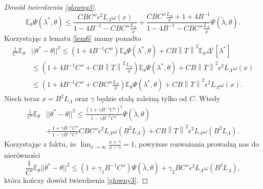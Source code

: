 \documentclass[man,mfiu]{mgrwms}
\newcommand{\norm}[1]{\left\lVert#1\right\rVert}
\begin{document}
\begin{proof}[Dowód twierdzenia \ref{glowny3}]
\begin{displaymath}
\mathbb{E}_{\theta}\Psi(\lambda^*,\theta)\leq \frac{CBC''\epsilon^2L_{\Lambda}\omega (x)}{1-4B^{-1}-CBC''\frac{L_{\Lambda}}{x}}+\frac{CBC''\frac{L_{\Lambda}}{x}+1+4B^{-1}}{1-4B^{-1}-CBC''\frac{L_{\Lambda}}{x}}\Psi(\tilde{\lambda},\theta).
\end{displaymath}
Korzystając z lematu \ref{lem6} mamy ponadto
\begin{displaymath}
\begin{split}
\frac{1}{C'}\mathbb{E}_{\theta}&||\theta^*-\theta||^2\leq (1+4B^{-1}C'')\mathbb{E}_{\theta}\Psi(\lambda^*,\theta)+CB\norm{T}^2\mathbb{E}_{\theta}\Delta^{\epsilon}[\lambda^*]\\
&\leq \left(1+4B^{-1}C''+CB\norm{T}^2\frac{L_{\Lambda}}{x}\right)\mathbb{E}_{\theta}\Psi(\lambda^*,\theta)+CB\norm{T}^2\epsilon^2L_{\Lambda}\omega (x)\\
&\leq \left(1+4B^{-1}C''+CBC''\frac{L_{\Lambda}}{x}\right)\mathbb{E}_{\theta}\Psi(\lambda^*,\theta)+CB\norm{T}^2\epsilon^2L_{\Lambda}\omega (x).
\end{split}
\end{displaymath}
Niech teraz $x=B^2L_{\Lambda}$ oraz $\gamma$ będzie stałą zależną tylko od $C$. Wtedy 
\begin{displaymath}
\begin{split}
\frac{1}{C'}\mathbb{E}_{\theta}&||\theta^*-\theta||^2\leq \frac{(1+\gamma B^{-1}C'')^2}{1-\gamma B^{-1}C''}\Psi(\tilde{\lambda},\theta)\\
&+ \frac{1+\gamma B^{-1}C''}{1-\gamma B^{-1}C''}CBC''\epsilon^2L_{\Lambda}\omega (B^2L_{\Lambda})+CB\norm{T}^2\epsilon^2L_{\Lambda}\omega (B^2L_{\Lambda}).
\end{split}
\end{displaymath}
Korzystając z faktu, że $\lim_{x\to \infty}\frac{x+\gamma}{x-\gamma}=1$, powyższe rozważania prowadzą nas do nierówności  
\begin{displaymath}
\frac{1}{C'}\mathbb{E}_{\theta}||\theta^*-\theta||^2\leq (1+\gamma_1B^{-1}C'')\Psi(\tilde{\lambda},\theta)+\gamma_2BC''\epsilon^2L_{\Lambda}\omega (B^2L_{\Lambda}),
\end{displaymath}
która kończy dowód twierdzenia \ref{glowny3}.
\end{proof}
\end{document}

